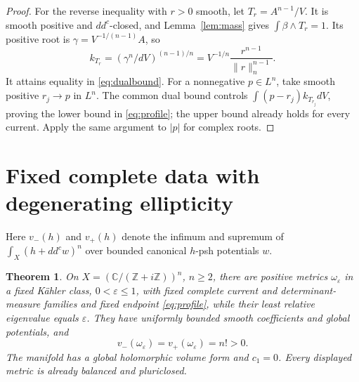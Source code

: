 \documentclass[11pt]{article}
\newcommand{\ddc}{dd^c}
\newtheorem{theorem}{Theorem}
\theoremstyle{remark}\newtheorem{remark}[theorem]{Remark}
\begin{document}
\begin{proof}
For the reverse inequality with $r>0$ smooth, let
$T_r=A^{n-1}/V$. It is smooth positive and $dd^c$-closed, and
Lemma~\ref{lem:mass} gives $\int\beta\wedge T_r=1$.
Its positive root is $\gamma=V^{-1/(n-1)}A$, so
\[
 k_{T_r}=(\gamma^n/dV)^{(n-1)/n}
       =V^{-1/n}\frac{r^{n-1}}{\|r\|_n^{n-1}}.
\]
It attains equality in \eqref{eq:dualbound}. For a nonnegative
$p\in L^n$, take smooth positive $r_j\to p$ in $L^n$. The common
dual bound controls $\int(p-r_j)k_{T_{r_j}}dV$, proving the lower
bound in \eqref{eq:profile}; the upper bound already holds for
every current. Apply the same argument to $|p|$ for complex roots.
\end{proof}

\section{Fixed complete data with degenerating ellipticity}
Here $v_-(h)$ and $v_+(h)$ denote the infimum and supremum of
$\int_X(h+\ddc w)^n$ over bounded canonical $h$-psh potentials $w$.
\begin{theorem}\label{th:degeneration}
On $X=(\mathbb C/(\mathbb Z+i\mathbb Z))^n$, $n\geq2$, there
are positive metrics $\omega_\varepsilon$ in a fixed K\"ahler
class, $0<\varepsilon\leq1$, with fixed complete current and
determinant-measure families and fixed endpoint \eqref{eq:profile},
while their least relative eigenvalue equals $\varepsilon$.
They have uniformly bounded smooth coefficients and global
potentials, and
\[
 v_-(\omega_\varepsilon)=v_+(\omega_\varepsilon)=n!>0.
\]
The manifold has a global holomorphic volume form and $c_1=0$.
Every displayed metric is already balanced and pluriclosed.
\end{theorem}
\end{document}
